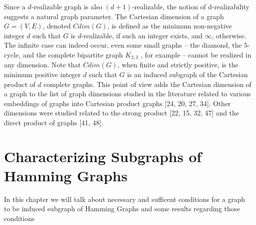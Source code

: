 \documentclass[12pt,a4paper,titlepage,openany]{report}
\begin{document}
Since a $d$-realizable graph is also $(d + 1)$-realizable, the notion of d-realizability suggests a natural graph parameter. The Cartesian dimension of a graph $G = (V, E)$, denoted $Cdim(G)$, is defined as the minimum non-negative integer $d$ such that $G$ is $d$-realizable, if such an integer exists, and $\infty$, otherwise. The infinite case can indeed occur, even some small graphs – the diamond, the 5-cycle, and the complete bipartite graph $K_{2,3}$ , for example – cannot be realized in any dimension. Note that $Cdim(G)$, when finite and strictly positive, is the minimum positive integer $d$ such that $G$ is an induced subgraph of the Cartesian product
of $d$ complete graphs. This point of view adds the Cartesian dimension of a graph to the list of graph dimensions studied in the literature related to various embeddings of graphs into Cartesian product graphs [24, 20, 27, 34]. Other dimensions were studied related to the
strong product [22, 15, 32, 47] and the direct product of graphs [41, 48].

\chapter{Characterizing Subgraphs of Hamming Graphs}
\thispagestyle{fancy}

In this chapter we will talk about necessary and sufficent conditions for a graph to be induced subgraph of Hamming Graphs and some results regarding those conditions 
\end{document}
